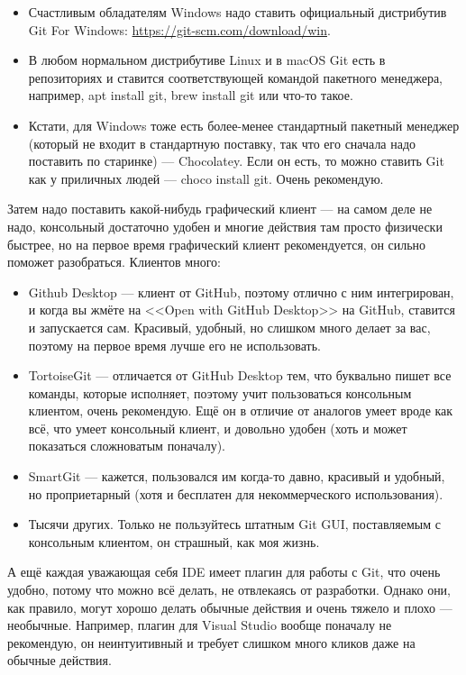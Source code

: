 \documentclass{../text-style}
\begin{document}
\begin{itemize}
    \item Счастливым обладателям Windows надо ставить официальный дистрибутив Git For Windows: \url{https://git-scm.com/download/win}.
    \item В любом нормальном дистрибутиве Linux и в macOS Git есть в репозиториях и ставится соответствующей командой пакетного менеджера, например, apt install git, brew install git или что-то такое.
    \item Кстати, для Windows тоже есть более-менее стандартный пакетный менеджер (который не входит в стандартную поставку, так что его сначала надо поставить по старинке) --- Chocolatey. Если он есть, то можно ставить Git как у приличных людей --- choco install git. Очень рекомендую.
\end{itemize}

Затем надо поставить какой-нибудь графический клиент --- на самом деле не надо, консольный достаточно удобен и многие действия там просто физически быстрее, но на первое время графический клиент рекомендуется, он сильно поможет разобраться. Клиентов много:

\begin{itemize}
    \item Github Desktop --- клиент от GitHub, поэтому отлично с ним интегрирован, и когда вы жмёте на <<Open with GitHub Desktop>> на GitHub, ставится и запускается сам. Красивый, удобный, но слишком много делает за вас, поэтому на первое время лучше его не использовать.
    \item TortoiseGit --- отличается от GitHub Desktop тем, что буквально пишет все команды, которые исполняет, поэтому учит пользоваться консольным клиентом, очень рекомендую. Ещё он в отличие от аналогов умеет вроде как всё, что умеет консольный клиент, и довольно удобен (хоть и может показаться сложноватым поначалу).
    \item SmartGit --- кажется, пользовался им когда-то давно, красивый и удобный, но проприетарный (хотя и бесплатен для некоммерческого использования).
    \item Тысячи других. Только не пользуйтесь штатным Git GUI, поставляемым с консольным клиентом, он страшный, как моя жизнь.
\end{itemize}

А ещё каждая уважающая себя IDE имеет плагин для работы с Git, что очень удобно, потому что можно всё делать, не отвлекаясь от разработки. Однако они, как правило, могут хорошо делать обычные действия и очень тяжело и плохо --- необычные. Например, плагин для Visual Studio вообще поначалу не рекомендую, он неинтуитивный и требует слишком много кликов даже на обычные действия. 
\end{document}
